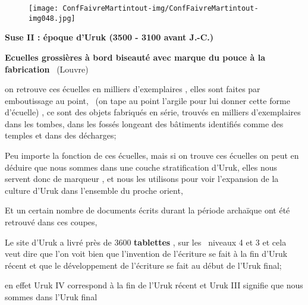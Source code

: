 \documentclass[a4paper]{article}
\begin{document}
\bigskip


\bigskip


\bigskip

\newline


\begin{figure}
\centering
\texttt{[image: ConfFaivreMartintout-img/ConfFaivreMartintout-img048.jpg]}
\end{figure}

\bigskip

{
\textbf{\textcolor[rgb]{0.18039216,0.18039216,0.18039216}{Suse II :
époque d'Uruk (3500 - 3100 avant J.-C.)}} }

{
\textbf{\textcolor[rgb]{0.18039216,0.18039216,0.18039216}{Ecuelles
grossières à bord biseauté avec marque du pouce à la fabrication}}
\ (Louvre)}


\bigskip


\bigskip

{
on retrouve ces écuelles en milliers d'exemplaires , elles sont faites
par emboutissage au point, \ (on tape au point l'argile pour lui donner
cette forme d'écuelle) , ce sont des objets fabriqués en série, trouvés
en milliers d'exemplaires dans les tombes, dans les fossés longeant des
bâtiments identifiés comme des temples et dans des décharges;}

{
Peu importe la fonction de ces écuelles, mais si on trouve ces écuelles
on peut en déduire que nous sommes dans une couche stratification
d'Uruk, elles nous servent donc de marqueur , et nous les utilisons
pour voir l'expansion de la culture d'Uruk dans l'ensemble du proche
orient, }


\bigskip

{
Et un certain nombre de documents écrits durant la période archaïque ont
été retrouvé dans ces coupes, }


\bigskip


\bigskip

{
Le site d'Uruk a livré près de 3600 \textbf{tablettes} , sur les
\ niveaux 4 et 3 et cela veut dire que l'on voit bien que l'invention
de l'écriture se fait à la fin d'Uruk récent et que le développement de
l'écriture se fait au début de l'Uruk final;}

{
en effet Uruk IV correspond à la fin de l'Uruk récent et Uruk III
signifie que nous sommes dans l'Uruk final}
\end{document}
